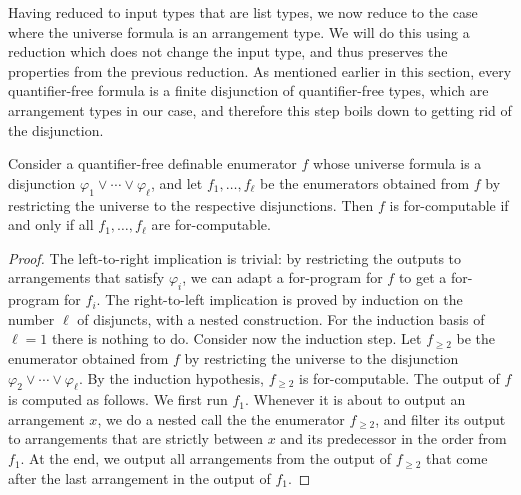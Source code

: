 Having reduced to input types that are list types, we now reduce to the case where the universe formula is an arrangement type. We will do this using a reduction which does not change the input type, and thus preserves the properties from the previous reduction. As mentioned earlier in this section, every quantifier-free formula is a finite disjunction of quantifier-free types, which are arrangement types in our case, and therefore this step boils down to getting rid of the disjunction. 
\begin{lemma}\label{lemma:merging-lemma}
    Consider a quantifier-free definable enumerator $f$ whose universe formula is a disjunction  $\varphi_1 \vee \cdots \vee \varphi_\ell$, and let $f_1,\ldots,f_\ell$  be the enumerators obtained from $f$ by  restricting the  universe to the respective disjunctions. Then $f$ is for-computable if and only if all $f_1,\ldots,f_\ell$ are for-computable.
\end{lemma}
\begin{proof}
    The left-to-right implication is trivial: by restricting the outputs to arrangements that satisfy $\varphi_i$, we can adapt a for-program for $f$ to get a for-program for $f_i$.   The  right-to-left implication is proved by induction on the number $\ell$ of disjuncts, with  a  nested construction. For the induction basis of $\ell =1 $ there is nothing to do. Consider now the induction step.   Let $f_{\ge 2}$ be the enumerator obtained from $f$ by restricting the universe to the disjunction $\varphi_2 \vee \cdots \vee \varphi_\ell$.  By the induction hypothesis, $f_{\ge 2}$ is for-computable. The output of $f$ is computed as follows. 
    We first run $f_1$. Whenever it is about to output an arrangement $x$, we do a nested call the the enumerator $f_{\ge 2}$, and filter its output to arrangements that are strictly between $x$ and its predecessor in the order from $f_1$. At the end, we output all arrangements from the output of $f_{\ge 2}$ that come after the last arrangement in the output of $f_1$.
\end{proof}

